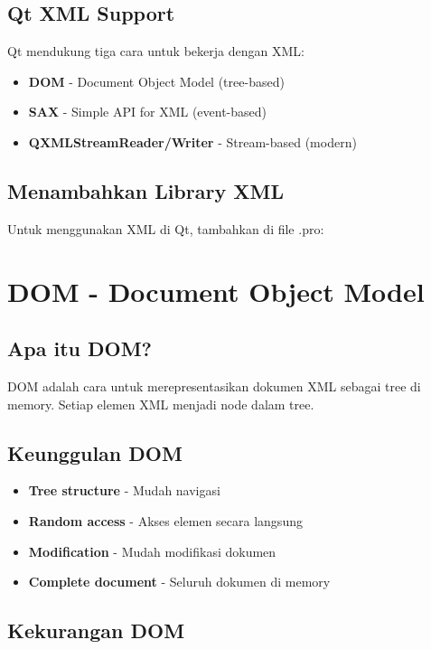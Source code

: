 \subsection{Qt XML Support}

Qt mendukung tiga cara untuk bekerja dengan XML:

\begin{itemize}
\item \textbf{DOM} - Document Object Model (tree-based)
\item \textbf{SAX} - Simple API for XML (event-based)
\item \textbf{QXMLStreamReader/Writer} - Stream-based (modern)
\end{itemize}

\subsection{Menambahkan Library XML}

Untuk menggunakan XML di Qt, tambahkan di file .pro:



\section{DOM - Document Object Model}

\subsection{Apa itu DOM?}

DOM adalah cara untuk merepresentasikan dokumen XML sebagai tree di memory. Setiap elemen XML menjadi node dalam tree.

\subsection{Keunggulan DOM}

\begin{itemize}
\item \textbf{Tree structure} - Mudah navigasi
\item \textbf{Random access} - Akses elemen secara langsung
\item \textbf{Modification} - Mudah modifikasi dokumen
\item \textbf{Complete document} - Seluruh dokumen di memory
\end{itemize}

\subsection{Kekurangan DOM}

